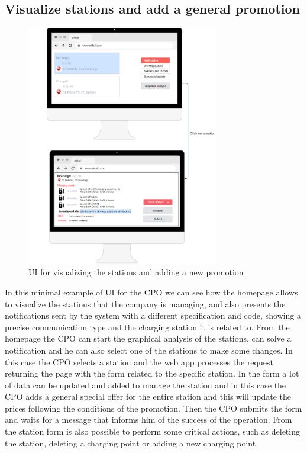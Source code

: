 \subsection{Visualize stations and add a general promotion}
\begin{figure}[H]
    \centering
    \includegraphics[width=0.75\textwidth]{Images/cp3/setPromotion.png}
    \caption{UI for visualizing the stations and adding a new promotion}
\end{figure}
In this minimal example of UI for the CPO we can see how the homepage allows to visualize the stations that the company is managing, and also presents the notifications sent by the system with a different specification and code, showing a precise communication type and the charging station it is related to. From the homepage the CPO can start the graphical analysis of the stations, can solve a notification and he can also select one of the stations to make some changes. In this case the CPO selects a station and the web app processes the request returning the page with the form related to the specific station. In the form a lot of data can be updated and added to manage the station and in this case the CPO adds a general special offer for the entire station and this will update the prices following the conditions of the promotion. Then the CPO submits the form and waits for a message that informs him of the success of the operation. From the station form is also possible to perform some critical actions, such as deleting the station, deleting a charging point or adding a new charging point.

